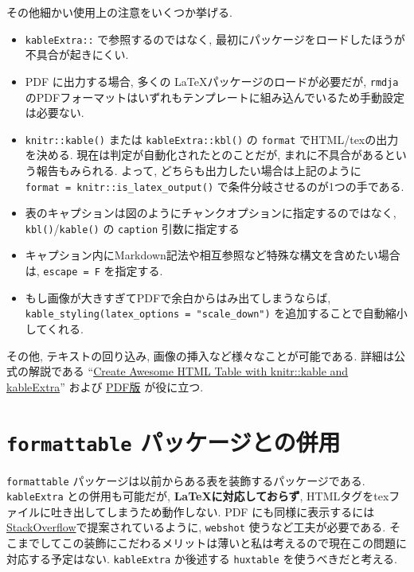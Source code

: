 \documentclass[
  xelatex,ja=standard,jafont=noto]{bxjsbook}
\providecommand{\tightlist}{%
  \setlength{\itemsep}{0pt}\setlength{\parskip}{0pt}}
\theoremstyle{definition}
\theoremstyle{definition}
\theoremstyle{definition}
\theoremstyle{definition}
\theoremstyle{remark}
\begin{document}
その他細かい使用上の注意をいくつか挙げる.

\begin{itemize}
\tightlist
\item
  \texttt{kableExtra::} で参照するのではなく,
  最初にパッケージをロードしたほうが不具合が起きにくい.
\item
  PDF に出力する場合, 多くの \LaTeX パッケージのロードが必要だが,
  \texttt{rmdja}
  のPDFフォーマットはいずれもテンプレートに組み込んでいるため手動設定は必要ない.
\item
  \texttt{knitr::kable()} または \texttt{kableExtra::kbl()} の
  \texttt{format} でHTML/texの出力を決める.
  現在は判定が自動化されたとのことだが,
  まれに不具合があるという報告もみられる. よって,
  どちらも出力したい場合は上記のように
  \texttt{format\ =\ knitr::is\_latex\_output()}
  で条件分岐させるのが1つの手である.
\item
  表のキャプションは図のようにチャンクオプションに指定するのではなく,
  \texttt{kbl()}/\texttt{kable()} の \texttt{caption} 引数に指定する
\item
  キャプション内にMarkdown記法や相互参照など特殊な構文を含めたい場合は,
  \texttt{escape\ =\ F} を指定する.
\item
  もし画像が大きすぎてPDFで余白からはみ出てしまうならば,
  \texttt{kable\_styling(latex\_options\ =\ "scale\_down")}
  を追加することで自動縮小してくれる.
\end{itemize}

その他, テキストの回り込み, 画像の挿入など様々なことが可能である.
詳細は公式の解説である
``\href{https://cran.r-project.org/web/packages/kableExtra/vignettes/awesome_table_in_html.html}{Create
Awesome HTML Table with knitr::kable and kableExtra}'' および
\href{http://haozhu233.github.io/kableExtra/awesome_table_in_pdf.pdf}{PDF版}
が役に立つ.

\hypertarget{formattable-ux30d1ux30c3ux30b1ux30fcux30b8ux3068ux306eux4f75ux7528}{%
\section{\texorpdfstring{\texttt{formattable}
パッケージとの併用}{formattable パッケージとの併用}}\label{formattable-ux30d1ux30c3ux30b1ux30fcux30b8ux3068ux306eux4f75ux7528}}

\texttt{formattable}
パッケージは以前からある表を装飾するパッケージである.
\texttt{kableExtra} との併用も可能だが,
\textbf{\LaTeX  に対応しておらず},
HTMLタグをtexファイルに吐き出してしまうため動作しない. PDF
にも同様に表示するには
\href{https://stackoverflow.com/questions/34983822/how-to-have-r-formattable-rendered-to-pdf-output-and-how-to-have-percents-in-the}{StackOverflow}で提案されているように,
\texttt{webshot} 使うなど工夫が必要である.
そこまでしてこの装飾にこだわるメリットは薄いと私は考えるので現在この問題に対応する予定はない.
\texttt{kableExtra} か後述する \texttt{huxtable} を使うべきだと考える.
\end{document}
